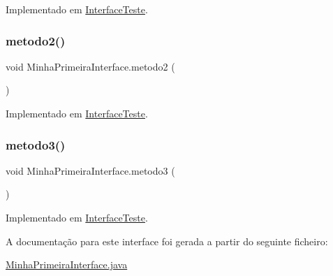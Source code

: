 Implementado em \hyperlink{class_interface_teste_a6b6f074e45a07ce51474f4e8cbcb4787}{Interface\+Teste}.

\hypertarget{interface_minha_primeira_interface_ad8461cbd12b06d9b8991e5c0558dbabb}{}\label{interface_minha_primeira_interface_ad8461cbd12b06d9b8991e5c0558dbabb} 
\subsubsection{\texorpdfstring{metodo2()}{metodo2()}}
{\footnotesize\ttfamily void Minha\+Primeira\+Interface.\+metodo2 (\begin{DoxyParamCaption}{ }\end{DoxyParamCaption})}



Implementado em \hyperlink{class_interface_teste_a3dd6ee8d550dacfab9ca0895ddf61468}{Interface\+Teste}.

\hypertarget{interface_minha_primeira_interface_a8cc4c146a3231985c6c31eb5c1e5d709}{}\label{interface_minha_primeira_interface_a8cc4c146a3231985c6c31eb5c1e5d709} 
\subsubsection{\texorpdfstring{metodo3()}{metodo3()}}
{\footnotesize\ttfamily void Minha\+Primeira\+Interface.\+metodo3 (\begin{DoxyParamCaption}{ }\end{DoxyParamCaption})}



Implementado em \hyperlink{class_interface_teste_a792ff1fc8b64a4ea9c4971e61281142d}{Interface\+Teste}.



A documentação para este interface foi gerada a partir do seguinte ficheiro\+:\begin{DoxyCompactItemize}
\item 
\hyperlink{_minha_primeira_interface_8java}{Minha\+Primeira\+Interface.\+java}\end{DoxyCompactItemize}
